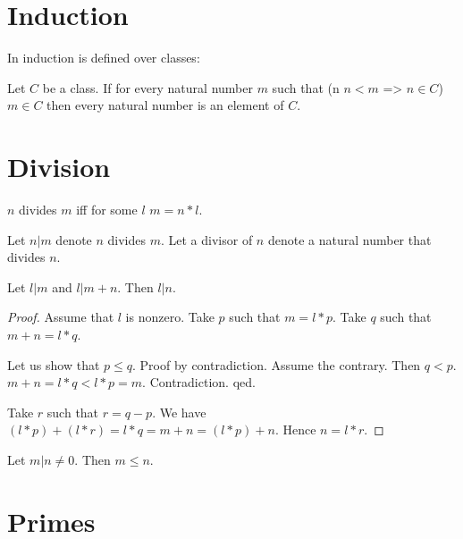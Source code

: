 \documentclass[11pt]{article}
\begin{document}
\section{Induction}

In \Naproche{} induction is defined over classes:

\begin{forthel}
\begin{axiom}[Induction]
  Let $C$ be a class.
  If for every natural number $m$ such that (\forall n $n < m$ => $n \in C$) $m \in C$
    then every natural number is an element of $C$.
\end{axiom}
\end{forthel}

\section{Division}

\begin{forthel}

\begin{definition}
  $n$ divides $m$ iff for some $l$ $m = n * l$.
\end{definition}

Let $n | m$ denote $n$ divides $m$.
Let a divisor of $n$ denote a natural number 
that divides $n$.

\begin{lemma}
  Let $l | m$ and $l | m + n$. Then $l | n$.
\end{lemma}

\begin{proof}
Assume that $l$ is nonzero.
Take $p$ such that $m = l * p$. 
Take $q$ such that $m + n = l * q$.

Let us show that 
$p \leq q$.
Proof by contradiction.
Assume the contrary. Then $q < p$.
$m+n = l * q < l * p = m$.
Contradiction. qed.

Take $r$ such that $r = q - p$.
We have $(l * p) + (l * r) = l * q = m + n = (l * p) + n$.
Hence $n = l * r$.
\end{proof}

\begin{lemma} Let $m | n \neq 0$. Then $m \leq n$.
\end{lemma}

\end{forthel}

\section{Primes}
\end{document}
